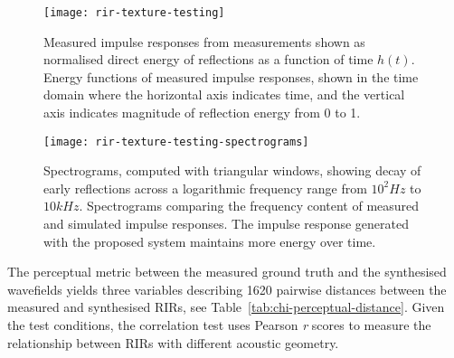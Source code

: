 \begin{figure}[htbp]%
    \centering
    \texttt{[image: rir-texture-testing]}%
    \caption[Texture-based system testing IR results --- time domain]{Measured impulse responses from measurements shown as normalised direct energy of reflections as a function of time $h(t)$.  Energy functions of measured impulse responses, shown in the time domain where the horizontal axis indicates time, and the vertical axis indicates magnitude of reflection energy from 0 to 1.}%
    \label{fig:texture-testing-rirs}%
\end{figure}%

\begin{figure}[htbp]%
    \centering
    \texttt{[image: rir-texture-testing-spectrograms]}%
    \caption[Texture-based system testing IR results --- frequency domain]{Spectrograms, computed with triangular windows, showing decay of early reflections across a logarithmic frequency range from $10^2Hz$ to $10kHz$. 
        Spectrograms comparing the frequency content of measured and simulated impulse responses. The impulse response generated with the proposed system maintains more energy over time.}%
    \label{fig:texture-testing-spectograms}%
\end{figure}%


The perceptual metric between the measured ground truth and the synthesised wavefields yields three variables describing 1620 pairwise distances between the measured and synthesised RIRs, see Table~\ref{tab:chi-perceptual-distance}. Given the test conditions, the correlation test uses Pearson \textit{r} scores to measure the relationship between RIRs with different acoustic geometry.

